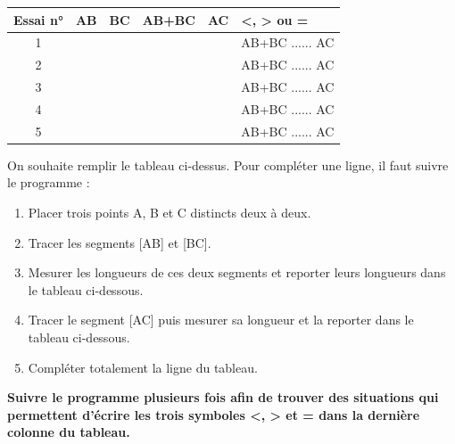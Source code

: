 \documentclass[a4paper]{book}
\begin{document}
\newcommand{\monTitre}{Règle et compas}

\setcounter{exo}{2}
\enteteActivite{2}{\monTitre}{\thechapter}

    \begin{exercice}
        \begin{tabular}{|c|l|l|l|l|l|}
            \hline
            Essai n° & AB & BC & AB+BC & AC & \textless , \; \textgreater \; ou \; = \\ \hline
            1        &    &    &       &    & AB+BC ...... AC                  \\ \hline
            2        &    &    &       &    & AB+BC ...... AC                  \\ \hline
            3        &    &    &       &    & AB+BC ...... AC                  \\ \hline
            4        &    &    &       &    & AB+BC ...... AC                  \\ \hline
            5        &    &    &       &    & AB+BC ...... AC                  \\ \hline
        \end{tabular}

        \medskip
        
        On souhaite remplir le tableau ci-dessus. Pour compléter une ligne, il faut suivre le programme :
        \begin{enumerate}
            \item[a.] Placer trois points A, B et C distincts deux à deux.

            \item[b.] Tracer les segments [AB] et [BC].

            \item[c.] Mesurer les longueurs de ces deux segments et reporter leurs longueurs dans le tableau ci-dessous.

            \item[d.] Tracer le segment [AC] puis mesurer sa longueur et la reporter dans le tableau ci-dessous.

            \item[e.] Compléter totalement la ligne du tableau.
        \end{enumerate}

        \medskip

        \textbf{Suivre le programme plusieurs fois afin de trouver des situations qui permettent d'écrire les trois symboles <, > et = dans la dernière colonne du tableau.}
    \end{exercice}
\end{document}
